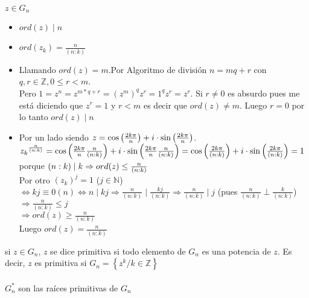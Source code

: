 \documentclass[a4paper,10pt]{article}
\begin{document}
\propiedades $z \in G_n$
\begin{itemize}
	\item $ord(z) \mid n$
	\item $ord(z_k) = \frac{n}{(n:k)}$
\end{itemize}
\ifversionlarga
\begin{demo}
	\begin{itemize}
		\item Llamando $ord(z)=m$.Por Algoritmo de división $n = mq + r$ con $q,r \in \mathbb{Z}, 0 \leq r < m$. \\
		Pero $1 = z^{n} = z^{m*q+r} = {\left( z^{m} \right)}^{q} z^{r} = 1^{q} z^{r} = z^{r}$. Si $r \neq 0$ es absurdo pues me está diciendo que $z^{r}=1$ y $r < m$ es decir que $ord(z) \neq m$. Luego $r = 0$ por lo tanto $ord(z) \mid n$
		\item Por un lado siendo $z = \cos \left( \frac{2k\pi}{n} \right) + i \cdot \sin \left( \frac{2k\pi}{n} \right)$.\\${z_{k}}^{\frac{n}{(n:k)}}=\cos \left( \frac{2k\pi}{n} \frac{n}{(n:k)} \right) + i \cdot \sin \left( \frac{2k\pi}{n} \frac{n}{(n:k)} \right) = \cos \left( \frac{2k\pi}{(n:k)} \right) + i \cdot \sin \left( \frac{2k\pi}{(n:k)} \right) = 1$ porque $(n:k) \mid k \\ \Rightarrow ord(z) \leq \frac{n}{(n:k)}$ \\
		Por otro ${\left(z_{k} \right)}^{j}=1$ ($j \in \mathbb{N}$) $\Leftrightarrow kj \equiv 0 (n) \Leftrightarrow n \mid kj \Rightarrow \frac{n}{(n:k)} \mid \frac{kj}{(n:k)} \Rightarrow \frac{n}{(n:k)} \mid j$ (pues $\frac{n}{(n:k)} \perp \frac{k}{(n:k)}$) $\Rightarrow \frac{n}{(n:k)} \leq j$ \\ $\Rightarrow ord(z) \geq \frac{n}{(n:k)}$ \\
		Luego $ord(z) = \frac{n}{(n:k)}$
	\end{itemize}
\end{demo}
\fi

 si $z \in G_n$, $z$ se dice primitiva si todo elemento de $G_n$ es una potencia de $z$. Es decir, $z$ es primitiva si $G_n = \left\lbrace z^{k} / k \in \mathbb{Z} \right\rbrace$ \\ \\

\notacion $G_{n}^{*}$ son las raíces primitivas de $G_n$ \\ \\
\end{document}
